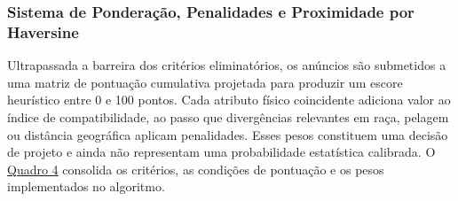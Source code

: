 \subsubsection{Sistema de Ponderação, Penalidades e Proximidade por Haversine}

Ultrapassada a barreira dos critérios eliminatórios, os anúncios são submetidos a uma matriz de pontuação cumulativa projetada para produzir um escore heurístico entre 0 e 100 pontos. Cada atributo físico coincidente adiciona valor ao índice de compatibilidade, ao passo que divergências relevantes em raça, pelagem ou distância geográfica aplicam penalidades. Esses pesos constituem uma decisão de projeto e ainda não representam uma probabilidade estatística calibrada. O \hyperref[quadro:matching]{Quadro 4} consolida os critérios, as condições de pontuação e os pesos implementados no algoritmo.

